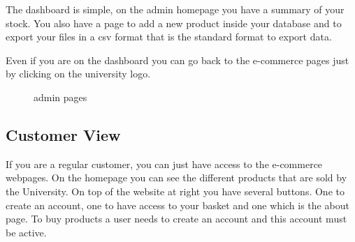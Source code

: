 \documentclass{article}
\begin{document}
The dashboard is simple, on the admin homepage you have a summary of your stock. You also have a page to add a new product inside your database and to export your files in a csv format that is the standard format to export data.

Even if you are on the dashboard you can go back to the e-commerce pages just by clicking on the university logo.

\begin{figure}[h!]
    \centering
    \qquad
    \caption{admin pages}%
    \label{fig:admin}%
\end{figure}

\subsection{Customer View}
If you are a regular customer, you can just have access to the e-commerce webpages. On the homepage you can see the different products that are sold by the University. On top of the website at right you have several buttons. One to create an account, one to have access to your basket and one which is the about page. To buy products a user needs to create an account and this account must be active.\\
\end{document}
